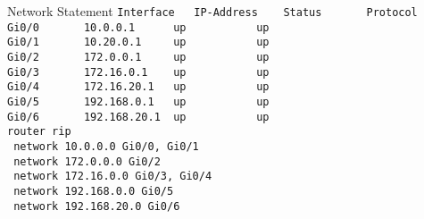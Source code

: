 \begin{frame}{Network Statement}
	\texttt{Interface~~~IP-Address~~~~Status~~~~~~~Protocol
		  \\Gi0/0~~~~~~~10.0.0.1~~~~~~up~~~~~~~~~~~up
		  \\Gi0/1~~~~~~~10.20.0.1~~~~~up~~~~~~~~~~~up
		  \\Gi0/2~~~~~~~172.0.0.1~~~~~up~~~~~~~~~~~up
		  \\Gi0/3~~~~~~~172.16.0.1~~~~up~~~~~~~~~~~up
		  \\Gi0/4~~~~~~~172.16.20.1~~~up~~~~~~~~~~~up
		  \\Gi0/5~~~~~~~192.168.0.1~~~up~~~~~~~~~~~up
		  \\Gi0/6~~~~~~~192.168.20.1~~up~~~~~~~~~~~up
		  \vspace{0.3cm}
		  \\router rip
		  \pause\\~network 10.0.0.0		\pause\hfill\textcolor<4->{black!50}{Gi0/0, Gi0/1}
		  \pause\\~network 172.0.0.0	\pause\hfill\textcolor<6->{black!50}{Gi0/2}
		  \pause\\~network 172.16.0.0	\pause\hfill\textcolor<8->{black!50}{Gi0/3, Gi0/4}
		  \pause\\~network 192.168.0.0	\pause\hfill\textcolor<10->{black!50}{Gi0/5}
		  \pause\\~network 192.168.20.0	\pause\hfill\textcolor<12->{black!50}{Gi0/6}}
\end{frame}

